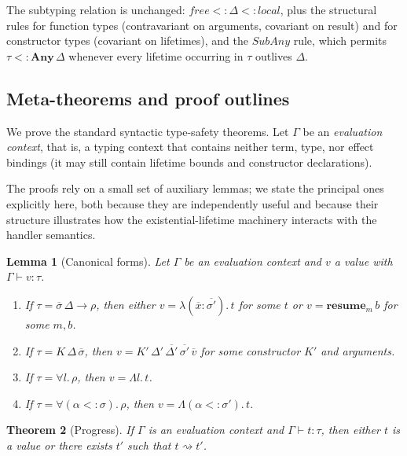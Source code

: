 \documentclass[12pt,a4paper]{article}
\newtheorem{theorem}{Theorem}
\newtheorem{lemma}[theorem]{Lemma}
\newcommand{\keyword}[1]{\mathbf{#1}}
\begin{document}
    The subtyping relation is unchanged: $free <: \Delta <: local$, plus the structural
    rules for function types (contravariant on arguments, covariant on result) and
    for constructor types (covariant on lifetimes), and the $SubAny$ rule, which
    permits $\tau <: \keyword{Any}\,\Delta$ whenever every lifetime occurring in $\tau$
    outlives $\Delta$.

    \subsection{Meta-theorems and proof outlines}

    We prove the standard syntactic type-safety theorems.
    Let $\Gamma$ be an \emph{evaluation context}, that is, a typing context that
    contains neither term, type, nor effect bindings (it may still contain lifetime
    bounds and constructor declarations).

    The proofs rely on a small set of auxiliary lemmas; we state the principal ones
    explicitly here, both because they are independently useful and because their
    structure illustrates how the existential-lifetime machinery interacts with the
    handler semantics.

    \begin{lemma}[Canonical forms]\label{lem:canonical}
        Let $\Gamma$ be an evaluation context and $v$ a value with $\Gamma \vdash v : \tau$.
        \begin{enumerate}
            \item If $\tau = \overline{\sigma}\,\Delta \to \rho$, then either
                $v = \lambda(\overline{x}:\overline{\sigma'}).\,t$ for some $t$ or
                $v = \keyword{resume}_m\,b$ for some $m, b$.
            \item If $\tau = K\,\Delta\,\overline{\sigma}$, then $v =
                K'\,\Delta'\,\overline{\Delta'}\,\overline{\sigma'}\,\overline{v}$ for
                some constructor $K'$ and arguments.
            \item If $\tau = \forall l.\,\rho$, then $v = \Lambda l.\,t$.
            \item If $\tau = \forall (\alpha <: \sigma).\,\rho$, then
                $v = \Lambda(\alpha <: \sigma').\,t$.
        \end{enumerate}
    \end{lemma}

    \begin{theorem}[Progress]\label{thm:progress}
        If $\Gamma$ is an evaluation context and $\Gamma \vdash t : \tau$, then either
        $t$ is a value or there exists $t'$ such that $t \rightsquigarrow t'$.
    \end{theorem}
\end{document}
